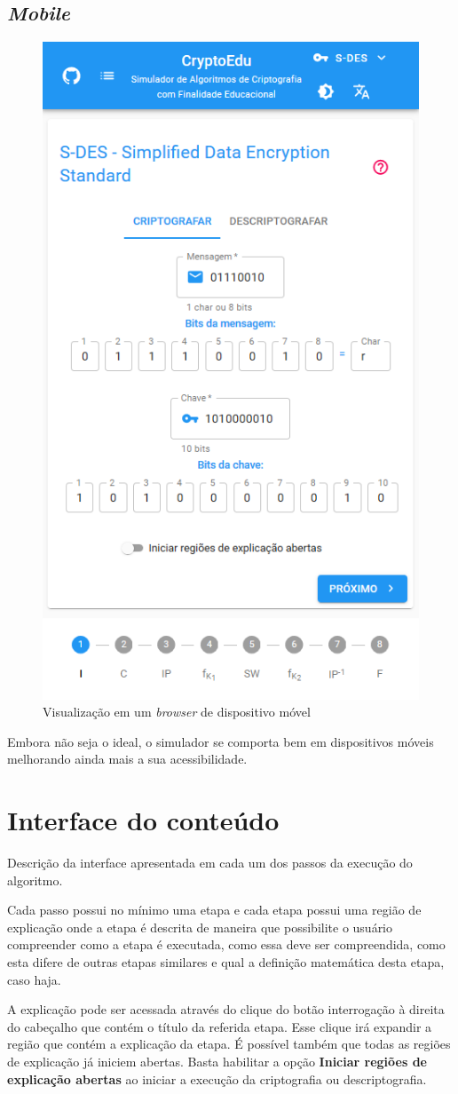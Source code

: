 \subsection{\textit{Mobile}}

\begin{figure}[H]
    \centering
    \caption{Visualização em um \textit{browser} de dispositivo móvel}
    \includegraphics[width=0.5\linewidth]{UI/UIMobile.png}
\end{figure}

Embora não seja o ideal, o simulador se comporta bem em dispositivos móveis melhorando ainda mais a sua acessibilidade.

\section{Interface do conteúdo}
Descrição da interface apresentada em cada um dos passos da execução do algoritmo.

Cada passo possui no mínimo uma etapa e cada etapa possui uma região de explicação onde a etapa é descrita de maneira que possibilite o usuário compreender como a etapa é executada, como essa deve ser compreendida, como esta difere de outras etapas similares e qual a definição matemática desta etapa, caso haja.

A explicação pode ser acessada através do clique do botão interrogação à direita do cabeçalho que contém o título da referida etapa. Esse clique irá expandir a região que contém a explicação da etapa. É possível também que todas as regiões de explicação já iniciem abertas. Basta habilitar a opção \textbf{Iniciar regiões de explicação abertas} ao iniciar a execução da criptografia ou descriptografia.

